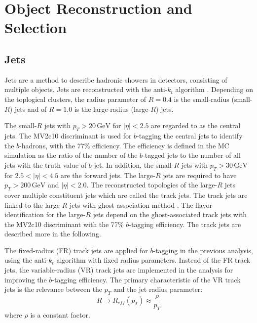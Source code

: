 \documentclass[class=NTHU_thesis, crop=false]{standalone}
\begin{document}
\chapter{Object Reconstruction and Selection}
\label{chap:object_reconstruction}
\section{Jets}
Jets are a method to describe hadronic showers in detectors, consisting of multiple objects. Jets are reconstructed with the anti-$k_t$ algorithm \cite{1126-6708-2008-04-063}. Depending on the toplogical clusters, the radius parameter of $R = 0.4$ is the small-radius (small-$R$) jets and of $R = 1.0$ is the large-radius (large-$R$) jets.

The small-$R$ jets with $p_T > 20\, \mathrm{GeV}$ for $\left|\eta\right| < 2.5$ are regarded to as the central jets. The MV2c10 discriminant \cite{ATL-PHYS-PUB-2015-022} is used for $b$-tagging the central jets to identify the $b$-hadrons, with the 77\% efficiency. The efficiency is defined in the MC simulation as the ratio of the number of the $b$-tagged jets to the number of all jets with the truth value of $b$-jet. In addition, the small-$R$ jets with $p_T > 30\, \mathrm{GeV}$ for $2.5 < \left|\eta\right| < 4.5$ are the forward jets. The large-$R$ jets are required to have $p_T > 200\, \mathrm{GeV}$ and $\left|\eta\right| < 2.0$. The reconstructed topologies of the large-$R$ jets cover multiple constituent jets which are called the track jets. The track jets are linked to the large-$R$ jets with ghost association method \cite{1126-6708-2008-04-005} \cite{CACCIARI2008119}. The flavor identification for the large-$R$ jets depend on the ghost-associated track jets with the MV2c10 discriminant with the 77\% $b$-tagging efficiency. The track jets are described more in the following.

The fixed-radius (FR) track jets are applied for $b$-tagging in the previous analysis, using the anti-$k_t$ algorithm with fixed radius parameters. Instead of the FR track jets, the variable-radius (VR) track jets \cite{0903.0392} are implemented in the analysis for improving the $b$-tagging efficiency. The primary characteristic of the VR track jets is the relevance between the $p_T$ and the jet radius parameter: 
\begin{equation}
R \to R_{eff}(p_T) \approx \frac{\rho}{p_T}
\end{equation}
where $\rho$ is a constant factor.
\end{document}

